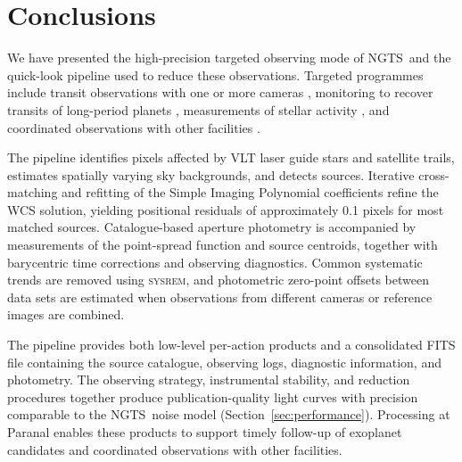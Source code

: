 \documentclass[fleqn,usenatbib]{mnras}
\newcommand{\ngts}{{NGTS}}
\begin{document}


\section{Conclusions}\label{sec:conclusion}

We have presented the high-precision targeted observing mode of \ngts\ and the quick-look pipeline used to reduce these observations. Targeted programmes include transit observations with one or more cameras \citep[e.g.][]{2020MNRAS.494.5872B,2020Natur.583...39A,2022MNRAS.514.1606B}, monitoring to recover transits of long-period planets \citep[e.g.][]{2020ApJ...898L..11G,2024MNRAS.532.1444G}, measurements of stellar activity \citep[e.g.][]{2023Natur.614..653A}, and coordinated observations with other facilities \citep{2022MNRAS.516..298D,2023MNRAS.522.4499D}.

The pipeline identifies pixels affected by VLT laser guide stars and satellite trails, estimates spatially varying sky backgrounds, and detects sources. Iterative cross-matching and refitting of the Simple Imaging Polynomial coefficients refine the WCS solution, yielding positional residuals of approximately 0.1 pixels for most matched sources. Catalogue-based aperture photometry is accompanied by measurements of the point-spread function and source centroids, together with barycentric time corrections and observing diagnostics. Common systematic trends are removed using \textsc{sysrem}, and photometric zero-point offsets between data sets are estimated when observations from different cameras or reference images are combined.

The pipeline provides both low-level per-action products and a consolidated FITS file containing the source catalogue, observing logs, diagnostic information, and photometry. The observing strategy, instrumental stability, and reduction procedures together produce publication-quality light curves with precision comparable to the \ngts\ noise model (Section~\ref{sec:performance}). Processing at Paranal enables these products to support timely follow-up of exoplanet candidates and coordinated observations with other facilities.
\end{document}
